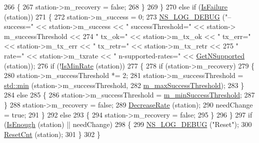 \begin{DoxyCode}
266         \{
267           station->m\_recovery = \textcolor{keyword}{false};
268         \}
269     \}
270   \textcolor{keywordflow}{else} \textcolor{keywordflow}{if} (\hyperlink{classns3_1_1AmrrWifiManager_a2eeedee27bdae52ea1df814da844fd7d}{IsFailure} (station))
271     \{
272       station->m\_success = 0;
273       \hyperlink{group__logging_ga413f1886406d49f59a6a0a89b77b4d0a}{NS\_LOG\_DEBUG} (\textcolor{stringliteral}{"-- success="} << station->m\_success << \textcolor{stringliteral}{" successThreshold="} << station->
      m\_successThreshold <<
274                     \textcolor{stringliteral}{" tx\_ok="} << station->m\_tx\_ok << \textcolor{stringliteral}{" tx\_err="} << station->m\_tx\_err << \textcolor{stringliteral}{" tx\_retr="} << 
      station->m\_tx\_retr <<
275                     \textcolor{stringliteral}{" rate="} << station->m\_txrate << \textcolor{stringliteral}{" n-supported-rates="} << 
      \hyperlink{classns3_1_1WifiRemoteStationManager_a7316bf091ebad5b8cd1a8b5ee47554d8}{GetNSupported} (station));
276       \textcolor{keywordflow}{if} (!\hyperlink{classns3_1_1AmrrWifiManager_a3b04e945ec1134121023bd783e42b8c8}{IsMinRate} (station))
277         \{
278           \textcolor{keywordflow}{if} (station->m\_recovery)
279             \{
280               station->m\_successThreshold *= 2;
281               station->m\_successThreshold = \hyperlink{80211b_8c_ac6afabdc09a49a433ee19d8a9486056d}{std::min} (station->m\_successThreshold,
282                                                       \hyperlink{classns3_1_1AmrrWifiManager_a76d77816378de62ab9b6d3f773490cf9}{m\_maxSuccessThreshold});
283             \}
284           \textcolor{keywordflow}{else}
285             \{
286               station->m\_successThreshold = \hyperlink{classns3_1_1AmrrWifiManager_a332a67b6b0cb14a3a4d410fda51c79c8}{m\_minSuccessThreshold};
287             \}
288           station->m\_recovery = \textcolor{keyword}{false};
289           \hyperlink{classns3_1_1AmrrWifiManager_a8b6f4c90ce3f7e9b6f40dae69b1bcb6c}{DecreaseRate} (station);
290           needChange = \textcolor{keyword}{true};
291         \}
292       \textcolor{keywordflow}{else}
293         \{
294           station->m\_recovery = \textcolor{keyword}{false};
295         \}
296     \}
297   \textcolor{keywordflow}{if} (\hyperlink{classns3_1_1AmrrWifiManager_a4d6e91edc5acf6552c99a8c9663ef799}{IsEnough} (station) || needChange)
298     \{
299       \hyperlink{group__logging_ga413f1886406d49f59a6a0a89b77b4d0a}{NS\_LOG\_DEBUG} (\textcolor{stringliteral}{"Reset"});
300       \hyperlink{classns3_1_1AmrrWifiManager_a6ffbd010f90fcf7f57f0d370dd7bd9a6}{ResetCnt} (station);
301     \}
302 \}
\end{DoxyCode}


